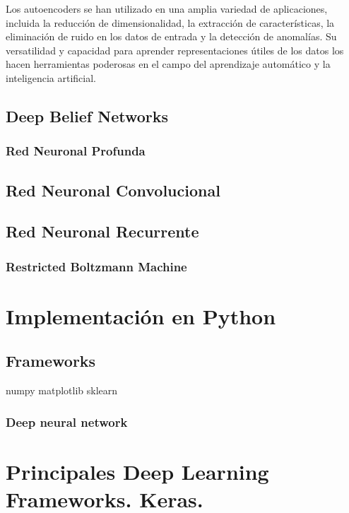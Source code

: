 Los autoencoders se han utilizado en una amplia variedad de aplicaciones, incluida la reducción de dimensionalidad, la extracción de características, la eliminación de ruido en los datos de entrada y la detección de anomalías. Su versatilidad y capacidad para aprender representaciones útiles de los datos los hacen herramientas poderosas en el campo del aprendizaje automático y la inteligencia artificial.



\subsection{Deep Belief Networks}
\subsubsection{Red Neuronal Profunda}
\subsection{Red Neuronal Convolucional}
\subsection{Red Neuronal Recurrente}
\subsubsection{Restricted Boltzmann Machine}


\section{Implementación en Python} \label{Subsec: 3_3}
\subsection{Frameworks}

numpy
matplotlib
sklearn

\subsubsection{Deep neural network}

\section{Principales Deep Learning Frameworks. Keras.}

